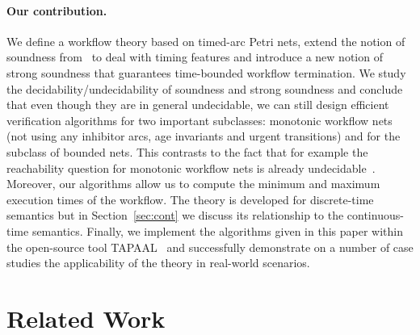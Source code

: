 \paragraph{Our contribution.}
We define a workflow theory based on timed-arc Petri nets,
extend the notion of soundness from~\cite{Aalst97} to deal with 
timing features and introduce a new notion of strong soundness
that guarantees time-bounded workflow termination. We study
the decidability/undecidability of soundness and strong soundness
and conclude that even though they are in general undecidable,
we can still design efficient verification algorithms for two important
subclasses: monotonic workflow nets 
(not using any inhibitor arcs, age invariants and urgent transitions)
and for the subclass of bounded nets. 
This contrasts to the fact that for example the reachability
question for monotonic workflow nets is already 
undecidable~\cite{RGE:reachability}. 
Moreover, our algorithms 
allow us to compute the minimum and maximum execution times of the
workflow. The theory is developed for
discrete-time semantics but in Section~\ref{sec:cont} we discuss its
relationship to the continuous-time semantics. Finally, we implement
the algorithms given in this paper within the open-source tool 
TAPAAL~\cite{DJJJMS:TACAS:12} and successfully demonstrate on a number of 
case studies the applicability of the theory in real-world scenarios.

\section*{Related Work}

